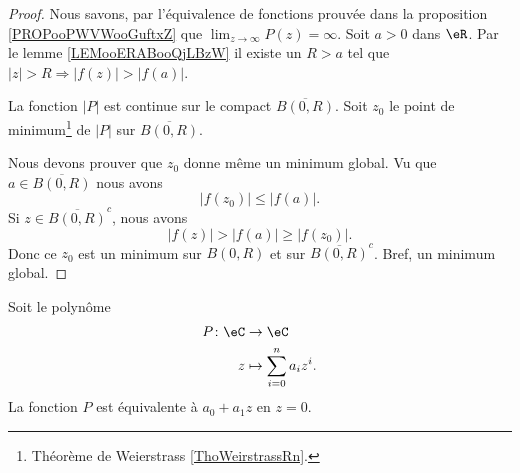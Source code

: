 \begin{proof}
    Nous savons, par l'équivalence de fonctions prouvée dans la proposition \ref{PROPooPWVWooGuftxZ} que \( \lim_{z\to \infty} P(z)=\infty\). Soit \( a>0\) dans \( \eR\). Par le lemme \ref{LEMooERABooQjLBzW} il existe un \( R>a\) tel que \( | z |>R\Rightarrow | f(z) |>| f(a) |\).

    La fonction \( | P |\) est continue sur le compact \( \overline{ B(0,R) }\). Soit \( z_0\) le point de minimum\footnote{Théorème de Weierstrass \ref{ThoWeirstrassRn}.} de \( | P |\) sur \( \overline{ B(0,R) }\).

    Nous devons prouver que \( z_0\) donne même un minimum global. Vu que \( a\in\overline{ B(0,R) }\) nous avons
    \begin{equation}
        | f(z_0) |\leq | f(a) |.
    \end{equation}
    Si \( z\in \overline{ B(0,R) }^c\), nous avons
    \begin{equation}
        | f(z) |>| f(a) |\geq | f(z_0) |.
    \end{equation}
    Donc ce \( z_0\) est un minimum sur \( B(0,R)\) et sur \( \overline{ B(0,R) }^c\). Bref, un minimum global.
\end{proof}

\begin{lemma}       \label{LEMooTTOYooXaukuH}
    Soit le polynôme
    \begin{equation}
        \begin{aligned}
            P\colon \eC&\to \eC \\
            z&\mapsto \sum_{i=0}^na_iz^i. 
        \end{aligned}
    \end{equation}
    La fonction \( P\) est équivalente à \( a_0+a_1z\) en \( z=0\).
\end{lemma}

